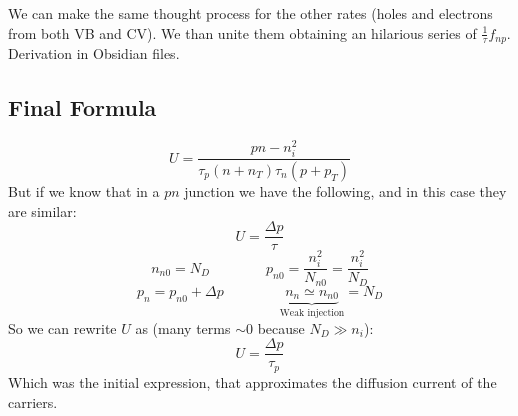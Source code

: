 We can make the same thought process for the other rates (holes and electrons from both VB and CV). We than unite them obtaining an hilarious series of $\frac{1}{\tau}f_{np}$. Derivation in Obsidian files.

\subsection{Final Formula}
\begin{equation}
    U = \frac{pn - n_i^2}{\tau_p (n+n_T) \tau_n (p+p_T)}
\end{equation}
But if we know that in a $pn$ junction we have the following, and in this case they are similar:
\begin{equation}
    U = \frac{\Delta p}{\tau}
\end{equation}
\begin{equation}
    n_{n0} = N_D \qquad \qquad p_{n0} = \frac{n_i^2}{N_{n0}} = \frac{n_i^2}{N_D}
\end{equation}
\begin{equation}
    p_n = p_{n0} + \Delta p \qquad \qquad \underbrace{n_n \simeq n_{n0}}_{\text{Weak injection}} = N_D
\end{equation}
So we can rewrite $U$ as (many terms $\sim 0$ because $N_D \gg n_i$):
\begin{equation}
    U = \frac{\Delta p}{\tau_p}
\end{equation}
Which was the initial expression, that approximates the diffusion current of the carriers.